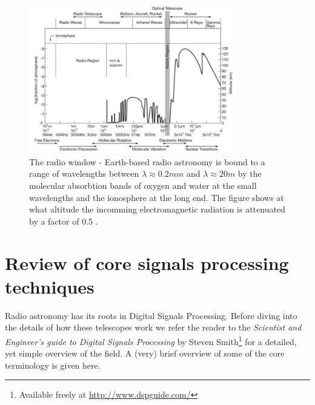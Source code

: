 \documentclass[a4paper,10pt]{report}
\begin{document}
\begin{figure}[ht]
 \begin{mdframed}
 \centering
 \includegraphics[width=0.8\textwidth]{images/radio_window.png}
 \caption[The radio window]{The radio window - Earth-based radio astronomy is bound to a range of wavelengths between $\lambda\approx 0.2mm$ and $\lambda\approx 20m$ by the molecular absorbtion bands of oxygen and water at the
 small wavelengths and the ionosphere at the long end. The figure shows at what altitude the incomming electromagnetic radiation is attenuated by a factor of 0.5 \cite{wilson2009tools}.}
 \label{fig_radio_window}
 \end{mdframed}
\end{figure}

\section{Review of core signals processing techniques}
Radio astronomy has its roots in Digital Signals Processing. Before diving into the details of how these telescopes work we refer the reader to the \textit{Scientist and Engineer's guide to Digital Signals Processing} by 
Steven Smith\footnote{Available freely at \url{http://www.dspguide.com/}}\cite{smith1997scientist} for a detailed, yet simple overview of the field. A (very) brief overview of some of the core terminology is given here.
\end{document}
